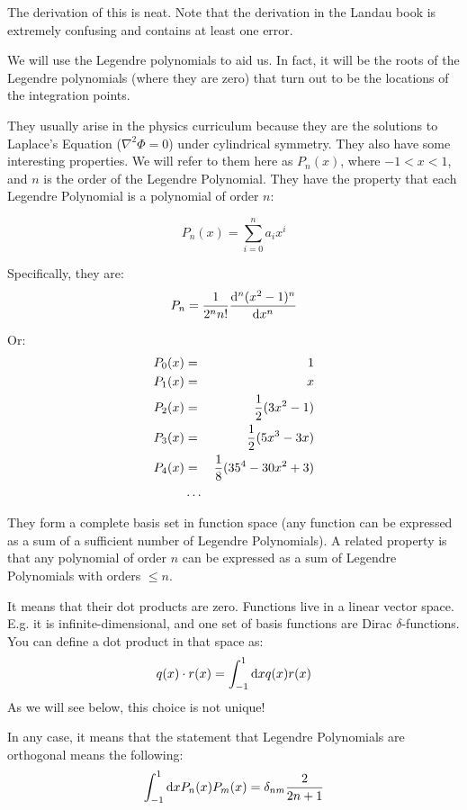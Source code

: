 The derivation of this is neat. Note that the derivation in the Landau
book is extremely confusing and contains at least one error.

We will use the Legendre polynomials to aid us. In fact, it will be
the roots of the Legendre polynomials (where they are zero) that turn
out to be the locations of the integration points.


\begin{answer}
  They usually arise in the physics curriculum because they are the
  solutions to Laplace's Equation ($\nabla^2 \Phi =0$) under
  cylindrical symmetry. They also have some interesting properties. We
  will refer to them here as $P_n(x)$, where $-1 < x < 1$, and $n$ is
  the order of the Legendre Polynomial. They have the property that
  each Legendre Polynomial is a polynomial of order $n$:

  \begin{equation}
    P_n(x) = \sum_{i=0}^n a_i x^i 
  \end{equation}

  Specifically, they are:
  \begin{equation}
    P_n = \frac{1}{2^n n!} \frac{{\rm d}^n(x^2 -1)^n}{{\rm d} x^n}
  \end{equation}

  Or:
  \begin{eqnarray}
    P_0(x) &=& 1 \cr
    P_1(x) &=& x \cr
    P_2(x) &=& \frac{1}{2}(3x^2 -1) \cr
    P_3(x) &=& \frac{1}{2}(5x^3 - 3x) \cr
    P_4(x) &=& \frac{1}{8}(35^4 - 30x^2 + 3) \cr
    &\ldots& 
  \end{eqnarray}

  They form a complete basis set in function space (any function can be
  expressed as a sum of a sufficient number of Legendre Polynomials).
  A related property is that any polynomial of order $n$ can be
  expressed as a sum of Legendre Polynomials with orders $\le n$.
\end{answer}


\begin{answer}
  It means that their dot products are zero. Functions live in a linear
  vector space. E.g. it is infinite-dimensional, and one set of basis
  functions are Dirac $\delta$-functions. You can define a dot product
  in that space as:
  \begin{equation}
    q(x) \cdot r(x) = \int_{-1}^{1} {\rm d}x q(x) r(x)
  \end{equation}
  As we will see below, this choice is not unique!

  In any case, it means that the statement that Legendre Polynomials
  are orthogonal means the following:
  \begin{equation}
    \int_{-1}^{1} {\rm d}x P_n(x) P_m(x) = \delta_{nm}
    \frac{2}{2n+1}
  \end{equation}
\end{answer}

